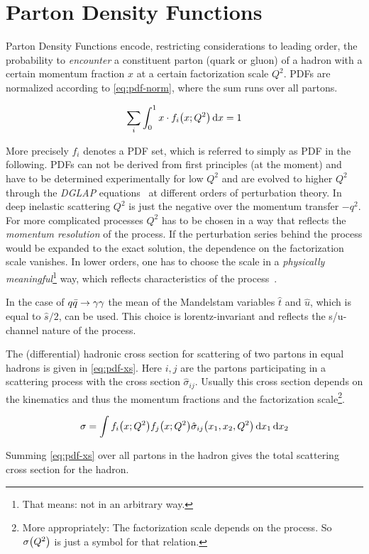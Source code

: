 \section{Parton Density Functions}%
\label{sec:pdf_basics}

Parton Density Functions encode, restricting considerations to leading
order, the probability to \emph{encounter} a constituent parton (quark
or gluon) of a hadron with a certain momentum fraction \(x\) at a
certain factorization scale \(Q^2\). PDFs are normalized according to
\cref{eq:pdf-norm}, where the sum runs over all partons.

\begin{equation}
  \label{eq:pdf-norm}
  \sum_i\int_0^1x\cdot f_i\qty(x;Q^2) \dd{x} = 1
\end{equation}

More precisely \({f_i}\) denotes a PDF set, which is referred to
simply as PDF in the following.  PDFs can not be derived from first
principles (at the moment) and have to be determined experimentally
for low \(Q^2\) and are evolved to higher \(Q^2\) through the
\emph{DGLAP} equations~\cite{altarelli:1977af} at different orders of
perturbation theory.  In deep inelastic scattering \(Q^2\) is just the
negative over the momentum transfer \(-q^2\). For more complicated
processes \(Q^2\) has to be chosen in a way that reflects the
\emph{momentum resolution} of the process. If the perturbation series
behind the process would be expanded to the exact solution, the
dependence on the factorization scale vanishes. In lower orders, one
has to choose the scale in a \emph{physically
  meaningful}\footnote{That means: not in an arbitrary way.} way,
which reflects characteristics of the process~\cite{altarelli:1977af}.

In the case of \(q\bar{q}\rightarrow\gamma\gamma\) the mean of the Mandelstam variables \(\hat{t}\)
and \(\hat{u}\), which is equal to \(\hat{s}/2\), can be used. This
choice is lorentz-invariant and reflects the s/u-channel nature of the
process.

The (differential) hadronic cross section for scattering of two
partons in equal hadrons is given in \cref{eq:pdf-xs}. Here \(i,j\)
are the partons participating in a scattering process with the cross
section \(\hat{\sigma}_{ij}\). Usually this cross section depends on
the kinematics and thus the momentum fractions and the factorization
scale\footnote{More appropriately: The factorization scale depends on
  the process. So \(\sigma\qty(Q^2)\) is just a symbol for that
  relation.}.

\begin{equation}
  \label{eq:pdf-xs}
  \sigma = \int f_i\qty(x;Q^2) f_j\qty(x;Q^2) \hat{\sigma}_{ij}\qty(x_1,
  x_2, Q^2)\dd{x_1}\dd{x_2}
\end{equation}

Summing \cref{eq:pdf-xs} over all partons in the hadron gives
the total scattering cross section for the hadron.

